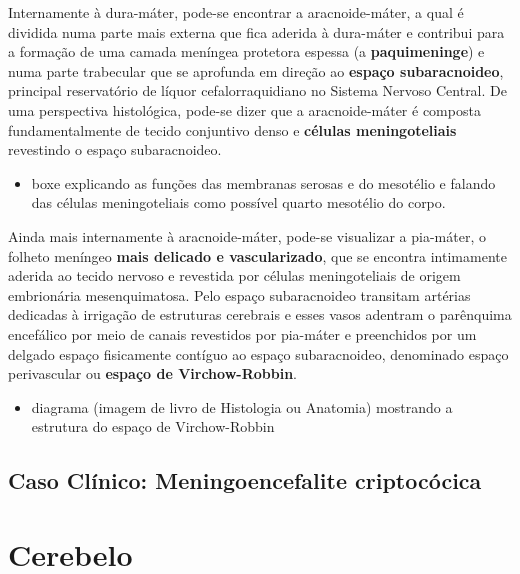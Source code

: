 \documentclass[
]{book}
\providecommand{\tightlist}{%
  \setlength{\itemsep}{0pt}\setlength{\parskip}{0pt}}
\theoremstyle{definition}
\theoremstyle{definition}
\theoremstyle{definition}
\theoremstyle{definition}
\theoremstyle{remark}
\begin{document}
Internamente à dura-máter, pode-se encontrar a aracnoide-máter, a qual é dividida numa parte mais externa que fica aderida à dura-máter e contribui para a formação de uma camada meníngea protetora espessa (a \textbf{paquimeninge}) e numa parte trabecular que se aprofunda em direção ao \textbf{espaço subaracnoideo}, principal reservatório de líquor cefalorraquidiano no Sistema Nervoso Central. De uma perspectiva histológica, pode-se dizer que a aracnoide-máter é composta fundamentalmente de tecido conjuntivo denso e \textbf{células meningoteliais} revestindo o espaço subaracnoideo.

\begin{itemize}
\tightlist
\item
  boxe explicando as funções das membranas serosas e do mesotélio e falando das células meningoteliais como possível quarto mesotélio do corpo.
\end{itemize}

Ainda mais internamente à aracnoide-máter, pode-se visualizar a pia-máter, o folheto meníngeo \textbf{mais delicado e vascularizado}, que se encontra intimamente aderida ao tecido nervoso e revestida por células meningoteliais de origem embrionária mesenquimatosa. Pelo espaço subaracnoideo transitam artérias dedicadas à irrigação de estruturas cerebrais e esses vasos adentram o parênquima encefálico por meio de canais revestidos por pia-máter e preenchidos por um delgado espaço fisicamente contíguo ao espaço subaracnoideo, denominado espaço perivascular ou \textbf{espaço de Virchow-Robbin}.

\begin{itemize}
\tightlist
\item
  diagrama (imagem de livro de Histologia ou Anatomia) mostrando a estrutura do espaço de Virchow-Robbin
\end{itemize}

\hypertarget{caso-cluxednico-meningoencefalite-criptocuxf3cica}{%
\section{Caso Clínico: Meningoencefalite criptocócica}\label{caso-cluxednico-meningoencefalite-criptocuxf3cica}}

\hypertarget{cerebelo}{%
\chapter{Cerebelo}\label{cerebelo}}
\end{document}
